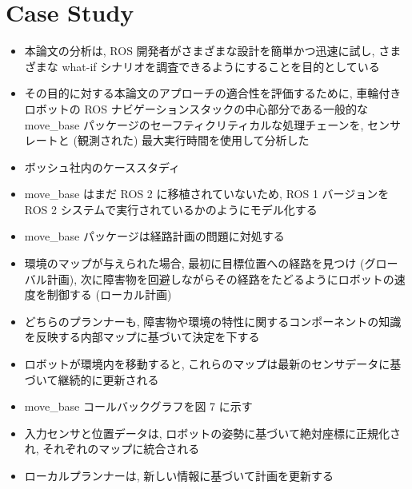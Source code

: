 
\section{Case Study}
\label{sec: case study}

\begin{frame}{}
    \begin{itemize}
        \item 本論文の分析は, ROS 開発者がさまざまな設計を簡単かつ迅速に試し, さまざまな what-if シナリオを調査できるようにすることを目的としている
\item その目的に対する本論文のアプローチの適合性を評価するために, 車輪付きロボットの ROS ナビゲーションスタックの中心部分である一般的な move\_base パッケージのセーフティクリティカルな処理チェーンを, センサレートと (観測された) 最大実行時間を使用して分析した
\item ボッシュ社内のケーススタディ
\item move\_base はまだ ROS 2 に移植されていないため, ROS 1 バージョンを ROS 2 システムで実行されているかのようにモデル化する
    \end{itemize}
\end{frame}

\begin{frame}{}
    \begin{itemize}
        \item move\_base パッケージは経路計画の問題に対処する
\item 環境のマップが与えられた場合, 最初に目標位置への経路を見つけ (グローバル計画), 次に障害物を回避しながらその経路をたどるようにロボットの速度を制御する (ローカル計画)
\item どちらのプランナーも, 障害物や環境の特性に関するコンポーネントの知識を反映する内部マップに基づいて決定を下する
\item ロボットが環境内を移動すると, これらのマップは最新のセンサデータに基づいて継続的に更新される
\item move\_base コールバックグラフを図 7 に示す
\item 入力センサと位置データは, ロボットの姿勢に基づいて絶対座標に正規化され, それぞれのマップに統合される
\item ローカルプランナーは, 新しい情報に基づいて計画を更新する
    \end{itemize}
\end{frame}

